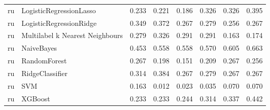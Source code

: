 \begin{tabular}{llllllll}
      ru &         LogisticRegressionLasso & 0.233 &                     0.221 &                 0.186 &                  0.326 &                                   0.326 &     0.395 \\
      ru &         LogisticRegressionRidge & 0.349 &                     0.372 &                 0.267 &                  0.279 &                                   0.256 &     0.267 \\
      ru & Multilabel k Nearest Neighbours & 0.279 &                     0.326 &                 0.291 &                  0.291 &                                   0.163 &     0.174 \\
      ru &                      NaiveBayes & 0.453 &                     0.558 &                 0.558 &                  0.570 &                                   0.605 &     0.663 \\
      ru &                    RandomForest & 0.267 &                     0.198 &                 0.151 &                  0.209 &                                   0.267 &     0.256 \\
      ru &                 RidgeClassifier & 0.314 &                     0.384 &                 0.267 &                  0.279 &                                   0.267 &     0.267 \\
      ru &                             SVM & 0.163 &                     0.012 &                 0.023 &                  0.035 &                                   0.070 &     0.070 \\
      ru &                         XGBoost & 0.233 &                     0.233 &                 0.244 &                  0.314 &                                   0.337 &     0.442 \\
\bottomrule
\end{tabular}
